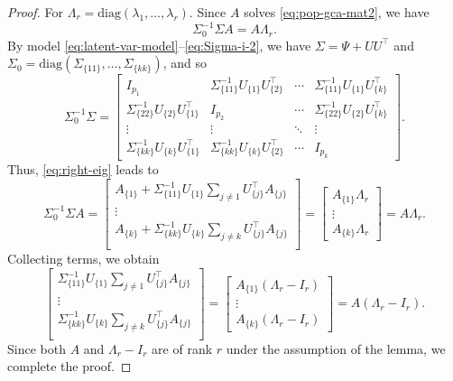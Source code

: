 \documentclass[11pt]{article}
\newcommand{\nb}[1]{\textcolor{orange}{\texttt{[#1]}}}
\newcommand{\gsc}[1]{\textcolor{blue}{\texttt{[#1]}}}
\newcommand{\dc}[1]{\{#1\}} %
\newcommand{\0}{{\mathbf{0}}}
\begin{document}
\begin{proof}
For $\Lambda_r = \mathrm{diag}(\lambda_1,\dots, \lambda_r)$. 
Since $A$ solves \eqref{eq:pop-gca-mat2}, we have 
\begin{equation}
      \label{eq:right-eig}
\Sigma_0^{-1}\Sigma A = A \Lambda_r.      
\end{equation}
By model \eqref{eq:latent-var-model}--\eqref{eq:Sigma-i-2}, we have
$\Sigma = \Psi + UU^\top$ and $\Sigma_0 = \mathrm{diag}(\Sigma_{\dc{11}},\dots, \Sigma_{\dc{kk}})$, and so
\begin{equation*}
\Sigma_0^{-1}\Sigma = 
\begin{bmatrix}
I_{p_1} & \Sigma^{-1}_{\dc{11}} U_{\dc{1}} U^\top_{\dc{2}} & \cdots & \Sigma^{-1}_{\dc{11}}U_{\dc{1}} U^\top_{\dc{k}}\\
\Sigma^{-1}_{\dc{22}} U_{\dc{2}} U^\top_{\dc{1}} & I_{p_2} & \cdots & \Sigma^{-1}_{\dc{22}} U_{\dc{2}} U^\top_{\dc{k}}\\
\vdots & \vdots & \ddots & \vdots \\
\Sigma^{-1}_{\dc{kk}} U_{\dc{k}} U^\top_{\dc{1}} & \Sigma^{-1}_{\dc{kk}} U_{\dc{k}} U^\top_{\dc{2}} & \cdots & I_{p_k}
\end{bmatrix}.
\end{equation*}
Thus, \eqref{eq:right-eig} leads to
\begin{equation*}
\Sigma_0^{-1}\Sigma A =
\begin{bmatrix}
A_{\dc{1}} + \Sigma^{-1}_{\dc{11}}U_{\dc{1}} \sum_{j\neq 1} U^\top_{\dc{j}}A_{\dc{j}}\\
\vdots \\
A_{\dc{k}} + \Sigma^{-1}_{\dc{kk}}U_{\dc{k}} \sum_{j\neq k} U^\top_{\dc{j}} A_{\dc{j}}\\
\end{bmatrix} 
=
\begin{bmatrix}
A_{\dc{1}} \Lambda_r \\ \vdots \\ A_{\dc{k}} \Lambda_r
\end{bmatrix} = A \Lambda_r.
\end{equation*}
Collecting terms, we obtain
\begin{equation*}
\begin{bmatrix}
\Sigma^{-1}_{\dc{11}}U_{\dc{1}} \sum_{j\neq 1} U^\top_{\dc{j}} A_{\dc{j}}\\
\vdots \\
\Sigma^{-1}_{\dc{kk}}U_{\dc{k}} \sum_{j\neq k} U^\top_{\dc{j}} A_{\dc{j}}\\
\end{bmatrix} 
=
\begin{bmatrix}
A_{\dc{1}} (\Lambda_r - I_r) \\ \vdots \\ A_{\dc{k}} (\Lambda_r-I_r)
\end{bmatrix} = A (\Lambda_r - I_r).
\end{equation*}
Since both $A$ and $\Lambda_r - I_r$ are of rank $r$ under the assumption of the lemma, we complete the proof.
\end{proof}
\end{document}
